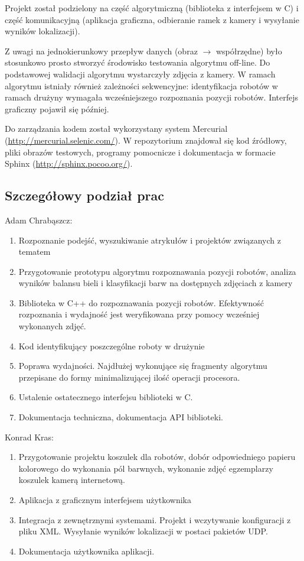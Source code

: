 \documentclass[polish,12pt]{aghthesis}
\begin{document}
Projekt został podzielony na część algorytmiczną (biblioteka z interfejsem w C)
i część komunikacyjną (aplikacja graficzna, odbieranie ramek z kamery i
wysyłanie wyników lokalizacji).

Z uwagi na jednokierunkowy przepływ danych (obraz $\to$ współrzędne) było 
stosunkowo prosto stworzyć środowisko testowania algorytmu off-line. Do 
podstawowej walidacji algorytmu wystarczyły zdjęcia z kamery. W ramach 
algorytmu istniały również zależności 
sekwencyjne: identyfikacja robotów w ramach drużyny wymagała wcześniejszego 
rozpoznania pozycji robotów. Interfejs graficzny pojawił się później. 

Do zarządzania kodem został wykorzystany system Mercurial
(\url{http://mercurial.selenic.com/}). 
W repozytorium znajdował się kod źródłowy, pliki obrazów testowych, programy
pomocnicze i dokumentacja w formacie Sphinx (\url{http://sphinx.pocoo.org/}).

\subsection{Szczegółowy podział prac}
Adam Chrabąszcz:
\begin{enumerate}
\item Rozpoznanie podejść, wyszukiwanie atrykułów i projektów związanych z
tematem
\item Przygotowanie prototypu algorytmu rozpoznawania pozycji robotów,
analiza wyników balansu bieli i klasyfikacji barw na dostępnych zdjęciach z
kamery
\item Biblioteka w C++ do rozpoznawania pozycji robotów. Efektywność
rozpoznania i wydajność jest weryfikowana przy pomocy wcześniej wykonanych 
zdjęć.
\item Kod identyfikujący poszczególne roboty w drużynie
\item Poprawa wydajności. Najdłużej wykonujące się fragmenty algorytmu 
przepisane do formy minimalizującej ilość operacji procesora.
\item Ustalenie ostatecznego interfejsu biblioteki w C.
\item Dokumentacja techniczna, dokumentacja API biblioteki.
\end{enumerate}
Konrad Kras:
\begin{enumerate}
\item Przygotowanie projektu koszulek dla robotów, dobór odpowiedniego papieru
kolorowego do wykonania pól barwnych, wykonanie zdjęć egzemplarzy koszulek
kamerą internetową.
\item Aplikacja z graficznym interfejsem użytkownika
\item Integracja z zewnętrznymi systemami. Projekt i wczytywanie konfiguracji z pliku XML. Wysyłanie wyników lokalizacji w postaci pakietów UDP.
\item Dokumentacja użytkownika aplikacji.
\end{enumerate}
\end{document}

